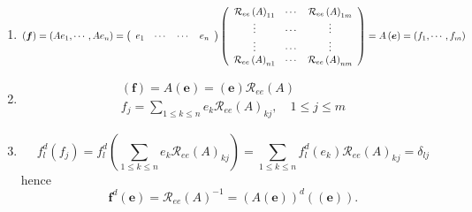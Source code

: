 \documentclass[aps,preprint]{revtex4}%
\begin{document}
\begin{enumerate}
\begin{enumerate}
\item
\begin{equation}
\left(  \boldsymbol{f}\right)  =\left(  Ae_{1},\cdots,Ae_{n}\right)  =\left(
\begin{array}
[c]{cccc}%
e_{1} & \cdots & \cdots & e_{n}%
\end{array}
\right)  \left(
\begin{array}
[c]{ccc}%
\mathcal{R}_{ee}\left(  A\right)  _{11} & \cdots & \mathcal{R}_{ee}\left(
A\right)  _{1m}\\
\vdots & \cdots & \vdots\\
\vdots & \cdots & \vdots\\
\mathcal{R}_{ee}\left(  A\right)  _{n1} & \cdots & \mathcal{R}_{ee}\left(
A\right)  _{nm}%
\end{array}
\right)  =A\left(  \boldsymbol{e}\right)  =\left(  f_{1},\cdots,f_{m}\right)
\end{equation}


\item
\begin{gather}
\left(  \boldsymbol{f}\right)  =A\left(  \boldsymbol{e}\right)  =\left(
\boldsymbol{e}\right)  \mathcal{R}_{ee}\left(  A\right) \\
f_{j}=\sum_{1\leq k\leq n}e_{k}\mathcal{R}_{ee}\left(  A\right)  _{kj}%
,\quad1\leq j\leq m
\end{gather}


\item
\begin{equation}
f_{l}^{d}\left(  f_{j}\right)  =f_{l}^{d}\left(  \sum_{1\leq k\leq n}%
e_{k}\mathcal{R}_{ee}\left(  A\right)  _{kj}\right)  =\sum_{1\leq k\leq
n}f_{l}^{d}\left(  e_{k}\right)  \mathcal{R}_{ee}\left(  A\right)
_{kj}=\delta_{lj}%
\end{equation}
hence
\begin{equation}
\boldsymbol{f}^{d}\left(  \boldsymbol{e}\right)  =\mathcal{R}_{ee}\left(
A\right)  ^{-1}=\left(  A\left(  \boldsymbol{e}\right)  \right)  ^{d}\left(
\left(  \boldsymbol{e}\right)  \right)  .
\end{equation}



\end{enumerate}
\end{enumerate}
\end{document}
